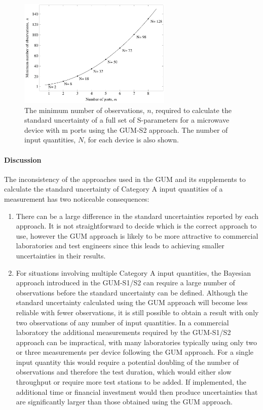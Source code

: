 \documentclass[../thesis/thesis.tex]{subfiles}
\begin{document}
\begin{refsection}
\begin{figure}
	\centering
	\includegraphics[width=0.65\textwidth]{gum_sparams}
	\caption{The minimum number of observations, $n$, required to calculate the standard uncertainty of a full set of S-parameters for a microwave device with m ports using the GUM-S2 approach. The number of input quantities, $N$, for each device is also shown.}
	\label{ch3_fig_gum_sparams}
\end{figure}

\paragraph{Discussion}

The inconsistency of the approaches used in the GUM and its supplements to calculate the standard uncertainty of Category A input quantities of a measurement has two noticeable consequences:

\begin{enumerate}
	\item There can be a large difference in the standard uncertainties reported by each approach. It is not straightforward to decide which is the correct approach to use, however the GUM approach is likely to be more attractive to commercial laboratories and test engineers since this leads to achieving smaller uncertainties in their results.
	\item For situations involving multiple Category A input quantities, the Bayesian approach introduced in the GUM-S1/S2 can require a large number of observations before the standard uncertainty can be defined. Although the standard uncertainty calculated using the GUM approach will become less reliable with fewer observations, it is still possible to obtain a result with only two observations of any number of input quantities. In a commercial laboratory the additional measurements required by the GUM-S1/S2 approach can be impractical, with many laboratories typically using only two or three measurements per device following the GUM approach. For a single input quantity this would require a potential doubling of the number of observations and therefore the test duration, which would either slow throughput or require more test stations to be added. If implemented, the additional time or financial investment would then produce uncertainties that are significantly larger than those obtained using the GUM approach.
\end{enumerate}


\end{refsection}
\end{document}
